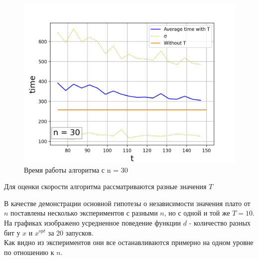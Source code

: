 \documentclass[times]{itmo-student-thesis}
\begin{document}
    \begin{figure}[H]
        \centering
        \caption{Время работы алгоритма с n = 30}
        \label{pic:sublists-metafile}
        \includegraphics[scale=0.8]{plot_time_30_as_30.png}
    \end{figure}

    Для оценки скорости алгоритма рассматриваются разные значения $T$

    В качестве демонстрации основной гипотезы о независимости значения плато от $n$ поставлены несколько экспериментов с разными $n$, но с одной и той же $T = 10$. \\
    На графиках изображено усредненное поведение функции $d$ - количество разных бит у $x$ и $x^{opt}$ за 20 запусков. \\
    Как видно из экспериментов они все останавливаются примерно на одном уровне по отношению к $n$. \\
\end{document}
